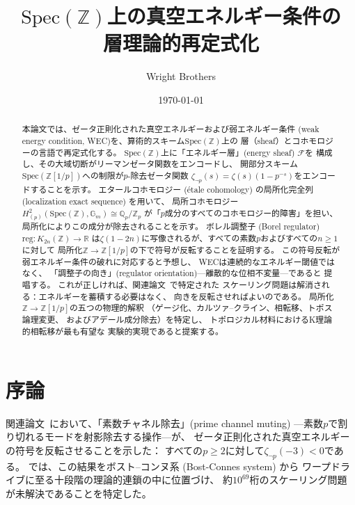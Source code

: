 \documentclass[11pt,a4paper]{article}
\newcommand{\Spec}{\mathrm{Spec}}
\newcommand{\Zp}{\mathbb{Z}[1/p]}
\newcommand{\Qp}{\mathbb{Q}_p}
\newcommand{\Gm}{\mathbb{G}_m}
\begin{document}
\title{$\Spec(\mathbb{Z})$上の真空エネルギー条件の\\
  層理論的再定式化}

\author{Wright Brothers}
\date{\today}

\begin{abstract}
本論文では、ゼータ正則化された真空エネルギーおよび弱エネルギー条件
(weak energy condition, WEC)を、算術的スキーム$\Spec(\mathbb{Z})$上の
層（sheaf）とコホモロジーの言語で再定式化する。
$\Spec(\mathbb{Z})$上に「エネルギー層」(energy sheaf) $\mathcal{F}$を
構成し、その大域切断がリーマンゼータ関数をエンコードし、
開部分スキーム$\Spec(\Zp)$への制限が$p$-除去ゼータ関数
$\zeta_{\neg p}(s) = \zeta(s)(1-p^{-s})$をエンコードすることを示す。
エタールコホモロジー (\'etale cohomology) の局所化完全列 (localization exact sequence) を用いて、
局所コホモロジー$H^2_{(p)}(\Spec(\mathbb{Z}), \Gm) \cong \Qp/\mathbb{Z}_p$
が「$p$成分のすべてのコホモロジー的障害」を担い、
局所化によりこの成分が除去されることを示す。
ボレル調整子 (Borel regulator) $\mathrm{reg}: K_{2n}(\mathbb{Z}) \to \mathbb{R}$
は$\zeta(1-2n)$に写像されるが、すべての素数$p$およびすべての$n \geq 1$に対して
局所化$\mathbb{Z} \to \Zp$の下で符号が反転することを証明する。
この符号反転が弱エネルギー条件の破れに対応すると予想し、
WECは連続的なエネルギー閾値ではなく、
「調整子の向き」(regulator orientation)---離散的な位相不変量---であると
提唱する。
これが正しければ、関連論文~\cite{paper_A,paper_C}で特定された
スケーリング問題は解消される：エネルギーを蓄積する必要はなく、
向きを反転させればよいのである。
局所化$\mathbb{Z} \to \Zp$の五つの物理的解釈
（ゲージ化、カルツァ--クライン、相転移、トポス論理変更、
およびアデール成分除去）を特定し、
トポロジカル材料におけるK理論的相転移が最も有望な
実験的実現であると提案する。
\end{abstract}

\maketitle

\section{序論}
\label{sec:intro}

関連論文~\cite{paper_A}において、「素数チャネル除去」(prime channel muting)
---素数$p$で割り切れるモードを射影除去する操作---が、
ゼータ正則化された真空エネルギーの符号を反転させることを示した：
すべての$p \geq 2$に対して$\zeta_{\neg p}(-3) < 0$である。
\cite{paper_C}では、この結果をボスト--コンヌ系 (Bost-Connes system) から
ワープドライブに至る十段階の理論的連鎖の中に位置づけ、
約$10^{69}$桁のスケーリング問題が未解決であることを特定した。
\end{document}
